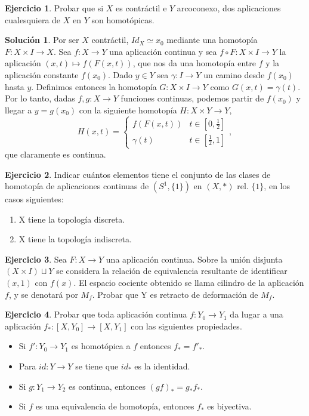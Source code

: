\documentclass{article}
\theoremstyle{plain}
\theoremstyle{definition}
\newtheorem{exercise}{Ejercicio}
\newtheorem*{sol*}{Solución}
\begin{document}
\newpage
\begin{exercise}
Probar que si $X$ es contráctil e $Y$ arcoconexo, dos aplicaciones cualesquiera de $X$ en $Y$ son homotópicas.
\end{exercise}
\begin{sol*}
Por ser $X$ contráctil, $Id_X\simeq x_0$ mediante una homotopía $F:X\times I\to X$. Sea $f:X\to Y$ una aplicación continua y sea $f\circ F: X\times I\to Y$ la aplicación $(x,t)\mapsto f(F(x,t))$, que nos da una homotopía entre $f$ y la aplicación constante $f(x_0)$. Dado $y\in Y$ sea $\gamma: I\to Y$ un camino desde $f(x_0)$ hasta $y$. Definimos entonces la homotopía $G:X\times I\to Y$ como $G(x,t)=\gamma(t)$. Por lo tanto, dadas $f,g:X\to Y$ funciones continuas, podemos partir de $f(x_0)$ y llegar a $y=g(x_0)$ con la siguiente homotopía $H:X\times Y\to Y$,
$$
H(x,t)=\begin{cases}
f(F(x,t)) & t\in[0,\frac{1}{2}]\\
\gamma(t) & t\in[\frac{1}{2},1]
\end{cases},
$$
que claramente es continua.
\end{sol*}
\newpage
\begin{exercise}
Indicar cuántos elementos tiene el conjunto de las clases de homotopía de aplicaciones continuas de $(S^1,\{1\})$ en $(X,*)$ rel. $\{1\}$, en los casos siguientes:
\begin{enumerate}
\item X tiene la topología discreta.
\item X tiene la topología indiscreta.
\end{enumerate}
\end{exercise}
\newpage
\begin{exercise}
Sea $F:X\to Y$ una aplicación continua. Sobre la unión disjunta $(X\times I)\sqcup Y$ se considera la relación de equivalencia resultante de identificar $(x,1)$ con $f(x)$. El espacio cociente obtenido se llama cilindro de la aplicación $f$, y se denotará por $M_f$. Probar que Y es retracto de deformación de $M_f$.
\end{exercise}
\newpage
\begin{exercise}
Probar que toda aplicación continua $f:Y_0\to Y_1$ da lugar a una aplicación $f_*:[X,Y_0]\to[X,Y_1]$ con las siguientes propiedades.
\begin{itemize}
\item Si $f':Y_0\to Y_1$ es homotópica a $f$ entonces $f_* =f'_*$.
\item Para $id:Y\to Y$ se tiene que $id_*$ es la identidad.
\item Si $g:Y_1\to Y_2$ es continua, entonces $(gf)_* = g_*f_*$.
\item Si $f$ es una equivalencia de homotopía, entonces $f_*$ es biyectiva.
\end{itemize}
\end{exercise}
\end{document}
